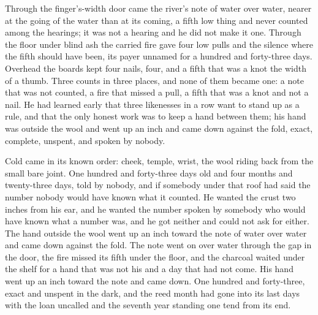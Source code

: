 Through the finger's-width door came the river's note of water over water, nearer at the going of the water than at its coming, a fifth low thing and never counted among the hearings; it was not a hearing and he did not make it one. Through the floor under blind ash the carried fire gave four low pulls and the silence where the fifth should have been, its payer unnamed for a hundred and forty-three days. Overhead the boards kept four nails, four, and a fifth that was a knot the width of a thumb. Three counts in three places, and none of them became one: a note that was not counted, a fire that missed a pull, a fifth that was a knot and not a nail. He had learned early that three likenesses in a row want to stand up as a rule, and that the only honest work was to keep a hand between them; his hand was outside the wool and went up an inch and came down against the fold, exact, complete, unspent, and spoken by nobody.

Cold came in its known order: cheek, temple, wrist, the wool riding back from the small bare joint. One hundred and forty-three days old and four months and twenty-three days, told by nobody, and if somebody under that roof had said the number nobody would have known what it counted. He wanted the crust two inches from his ear, and he wanted the number spoken by somebody who would have known what a number was, and he got neither and could not ask for either. The hand outside the wool went up an inch toward the note of water over water and came down against the fold. The note went on over water through the gap in the door, the fire missed its fifth under the floor, and the charcoal waited under the shelf for a hand that was not his and a day that had not come. His hand went up an inch toward the note and came down. One hundred and forty-three, exact and unspent in the dark, and the reed month had gone into its last days with the loan uncalled and the seventh year standing one tend from its end.
